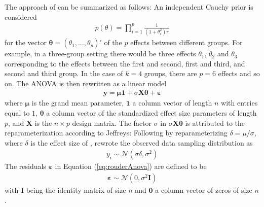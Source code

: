 The approach of \cite{Rouder2012} can be summarized as follows:  An independent Cauchy prior is considered
\begin{align}\label{eq:indepCauchyPrior}
	p(\theta)=\prod_{i=1}^p \frac{1}{(1+\theta_i^2)\pi}	
\end{align}
for the vector $\boldsymbol{\theta}=(\theta_1,...,\theta_p)'$ of the $p$ effects between different groups. For example, in a three-group setting there would be three effects $\theta_1$, $\theta_2$ and $\theta_3$ corresponding to the effects between the first and second, first and third, and second and third group. In the case of $k=4$ groups, there are $p=6$ effects and so on. The ANOVA is then rewritten as a linear model
\begin{align}\label{eq:rouderAnova}
	\boldsymbol{y}=\boldsymbol{\mu} \boldsymbol{1}+\sigma \boldsymbol{X} \boldsymbol{\theta} +\boldsymbol{\varepsilon}	
\end{align}
where $\boldsymbol{\mu}$ is the grand mean parameter, $\boldsymbol{1}$ a column vector of length $n$ with entries equal to $1$, $\boldsymbol{\theta}$ a column vector of the standardized effect size parameters of length $p$, and $\boldsymbol{X}$ is the $n\times p$ design matrix. The factor $\sigma$ in $\sigma\boldsymbol{X}\boldsymbol{\theta}$ is attributed to the reparameterization according to Jeffreys: Following \cite{jeffreys1961} by reparameterizing $\delta=\mu/\sigma$, where $\delta$ is the effect size of \cite{cohen_statistical_1988}, \cite{Rouder2012} rewrote the observed data sampling distribution as
\begin{align}
	y_i \sim \mathcal{N}(\sigma \delta,\sigma^2)	
\end{align}
The residuals $\boldsymbol{\varepsilon}$ in Equation (\ref{eq:rouderAnova}) are defined to be
\begin{align}
	\boldsymbol{\varepsilon} \sim \mathcal{N}(0,\sigma^2 \boldsymbol{I})
\end{align}
with $\boldsymbol{I}$ being the identity matrix of size $n$ and $\boldsymbol{0}$ a column vector of zeros of size $n$.


